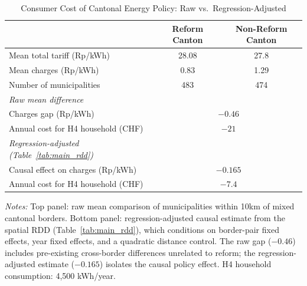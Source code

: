 \begin{table}[htbp]
\centering
\caption{Consumer Cost of Cantonal Energy Policy: Raw vs.\ Regression-Adjusted}
\label{tab:counterfactual}
\begin{tabular}{lcc}
\toprule
 & Reform Canton & Non-Reform Canton \\
\midrule
Mean total tariff (Rp/kWh) & 28.08 & 27.8 \\
Mean charges (Rp/kWh) & 0.83 & 1.29 \\
Number of municipalities & 483 & 474 \\
\midrule
\textit{Raw mean difference} & & \\
\quad Charges gap (Rp/kWh) & \multicolumn{2}{c}{$-0.46$} \\
\quad Annual cost for H4 household (CHF) & \multicolumn{2}{c}{$-21$} \\
\midrule
\textit{Regression-adjusted (Table~\ref{tab:main_rdd})} & & \\
\quad Causal effect on charges (Rp/kWh) & \multicolumn{2}{c}{$-0.165$} \\
\quad Annual cost for H4 household (CHF) & \multicolumn{2}{c}{$-7.4$} \\
\bottomrule
\end{tabular}
\begin{tablenotes}[flushleft]
\small
\item \textit{Notes:} Top panel: raw mean comparison of municipalities within 10km of mixed cantonal borders. Bottom panel: regression-adjusted causal estimate from the spatial RDD (Table~\ref{tab:main_rdd}), which conditions on border-pair fixed effects, year fixed effects, and a quadratic distance control. The raw gap ($-0.46$) includes pre-existing cross-border differences unrelated to reform; the regression-adjusted estimate ($-0.165$) isolates the causal policy effect. H4 household consumption: 4,500 kWh/year.
\end{tablenotes}
\end{table}
